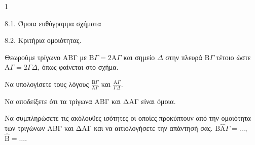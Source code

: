 \begin{ylh}{1}
    \item 8.1. Όμοια ευθύγραμμα σχήματα
    \item 8.2. Κριτήρια ομοιότητας.
\end{ylh}
\begin{figure} %
    \centering
\end{figure}
Θεωρούμε τρίγωνο ΑΒΓ με $\text{B}\Gamma = 2\text{A}\Gamma$ και σημείο $\Delta$ στην πλευρά $\text{B}\Gamma$ τέτοιο ώστε $\text{A}\Gamma = 2\Gamma\Delta$, όπως φαίνεται στο σχήμα.

\begin{alist}
\item Να υπολογίσετε τους λόγους $\frac{\text{B}\Gamma}{\text{A}\Gamma}$ και $\frac{\text{A}\Gamma}{\Gamma\Delta}$. 
\item Να αποδείξετε ότι τα τρίγωνα ΑΒΓ και ΔΑΓ είναι όμοια. 
\item Να συμπληρώσετε τις ακόλουθες ισότητες οι οποίες προκύπτουν από την ομοιότητα των τριγώνων ΑΒΓ και ΔΑΓ και να αιτιολογήσετε την απάντησή σας.
    $\text{B}\widehat{\text{A}}\Gamma = \dots$, $\widehat{\text{B}} = \dots$. 
\end{alist}